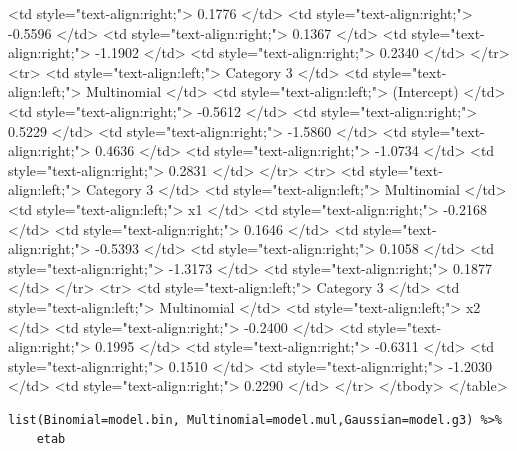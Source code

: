 \documentclass[a4paper]{article}
\begin{document}
\begin{HTML}
   <td style="text-align:right;"> 0.1776 </td>
   <td style="text-align:right;"> -0.5596 </td>
   <td style="text-align:right;"> 0.1367 </td>
   <td style="text-align:right;"> -1.1902 </td>
   <td style="text-align:right;"> 0.2340 </td>
  </tr>
  <tr>
   <td style="text-align:left;"> Category 3 </td>
   <td style="text-align:left;"> Multinomial </td>
   <td style="text-align:left;"> (Intercept) </td>
   <td style="text-align:right;"> -0.5612 </td>
   <td style="text-align:right;"> 0.5229 </td>
   <td style="text-align:right;"> -1.5860 </td>
   <td style="text-align:right;"> 0.4636 </td>
   <td style="text-align:right;"> -1.0734 </td>
   <td style="text-align:right;"> 0.2831 </td>
  </tr>
  <tr>
   <td style="text-align:left;"> Category 3 </td>
   <td style="text-align:left;"> Multinomial </td>
   <td style="text-align:left;"> x1 </td>
   <td style="text-align:right;"> -0.2168 </td>
   <td style="text-align:right;"> 0.1646 </td>
   <td style="text-align:right;"> -0.5393 </td>
   <td style="text-align:right;"> 0.1058 </td>
   <td style="text-align:right;"> -1.3173 </td>
   <td style="text-align:right;"> 0.1877 </td>
  </tr>
  <tr>
   <td style="text-align:left;"> Category 3 </td>
   <td style="text-align:left;"> Multinomial </td>
   <td style="text-align:left;"> x2 </td>
   <td style="text-align:right;"> -0.2400 </td>
   <td style="text-align:right;"> 0.1995 </td>
   <td style="text-align:right;"> -0.6311 </td>
   <td style="text-align:right;"> 0.1510 </td>
   <td style="text-align:right;"> -1.2030 </td>
   <td style="text-align:right;"> 0.2290 </td>
  </tr>
</tbody>
</table>
\end{HTML}

\lstset{numbers=left,language=r,label= ,caption= ,captionpos=b}
\begin{lstlisting}
list(Binomial=model.bin, Multinomial=model.mul,Gaussian=model.g3) %>%
    etab
\end{lstlisting}
\end{document}
